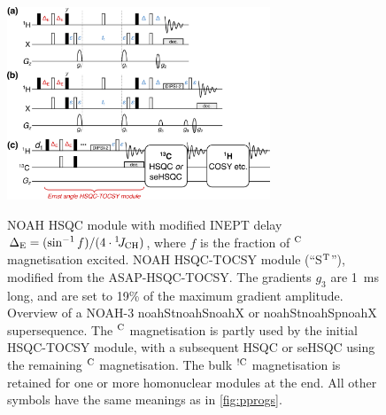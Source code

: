 \documentclass[11pt]{article}
\newcommand*{\noahthree}[3]{\csname noah#1\endcsname\csname noah#2\endcsname\csname noah#3\endcsname}
\newcommand*{\noahSt}{S$\rm ^T$}
\newcommand*{\onejch}{{}^{1}\!J_{\ce{CH}}}
\newcommand*{\magn}[1]{\ce{^1H}$^{#1}$}
\newcommand*{\magnnot}[1]{\ce{^1H}$^{!#1}$}
\begin{document}
\begin{figure}
    \centering
    \includegraphics[width=0.7\textwidth]{pprogs_hsqct.png}
    {\label{fig:pprogs_hsqct_hsqc}}
    {\label{fig:pprogs_hsqct_hsqct}}
    {\label{fig:pprogs_hsqct_superseq}}
    \caption{
        \textbf{} NOAH HSQC module with modified INEPT delay $\Delta_{\mathrm{E}} = (\sin^{-1} f)/(4\cdot\onejch)$, where $f$ is the fraction of \magn{\ce{C}} magnetisation excited.
        \textbf{} NOAH HSQC-TOCSY module (``\noahSt{}''), modified from the ASAP-HSQC-TOCSY.\autocite{Becker2019JMR}
        The gradients $g_3$ are \SI{1}{\ms} long, and are set to 19\% of the maximum gradient amplitude.
        \textbf{} Overview of a NOAH-3 \noahthree{St}{S}{X} or \noahthree{St}{Sp}{X} supersequence.
        The \magn{\ce{C}} magnetisation is partly used by the initial HSQC-TOCSY module, with a subsequent HSQC or seHSQC using the remaining \magn{\ce{C}} magnetisation.
        The bulk \magnnot{\ce{C}} magnetisation is retained for one or more homonuclear modules at the end.
        All other symbols have the same meanings as in \cref{fig:pprogs}.
    }
    \label{fig:pprogs_hsqct}
\end{figure}
\end{document}
